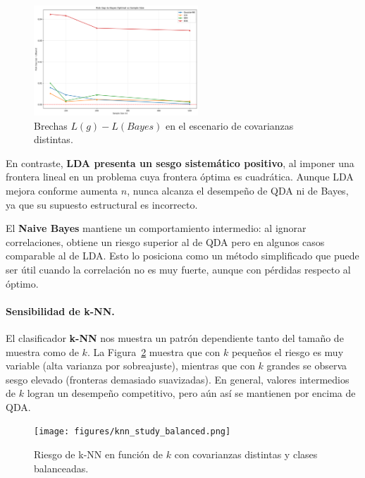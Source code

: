 \documentclass[10pt]{article}
\begin{document}
\begin{figure}[H]
    \centering
    \includegraphics[width=0.55\textwidth]{figures/risk_gaps.png}
    \caption{Brechas $L(g)-L(Bayes)$ en el escenario de covarianzas distintas.}
    \label{fig:riskgap_diffcov}
\end{figure}

En contraste, \textbf{LDA presenta un sesgo sistemático positivo}, al imponer una frontera lineal en un problema cuya frontera óptima es cuadrática. 
Aunque LDA mejora conforme aumenta $n$, nunca alcanza el desempeño de QDA ni de Bayes, ya que su supuesto estructural es incorrecto.

El \textbf{Naive Bayes} mantiene un comportamiento intermedio: al ignorar correlaciones, obtiene un riesgo superior al de QDA pero en algunos casos comparable al de LDA. 
Esto lo posiciona como un método simplificado que puede ser útil cuando la correlación no es muy fuerte, aunque con pérdidas respecto al óptimo.

\paragraph{Sensibilidad de k-NN.}
El clasificador \textbf{k-NN} nos muestra un patrón dependiente tanto del tamaño de muestra como de $k$. 
La Figura~\ref{fig:knn_diffcov} muestra que con $k$ pequeños el riesgo es muy variable (alta varianza por sobreajuste), mientras que con $k$ grandes se observa sesgo elevado (fronteras demasiado suavizadas). 
En general, valores intermedios de $k$ logran un desempeño competitivo, pero aún así se mantienen por encima de QDA.

\begin{figure}[H]
    \centering
    \texttt{[image: figures/knn\_study\_balanced.png]}
    \caption{Riesgo de k-NN en función de $k$ con covarianzas distintas y clases balanceadas.}
    \label{fig:knn_diffcov}
\end{figure}
\end{document}
